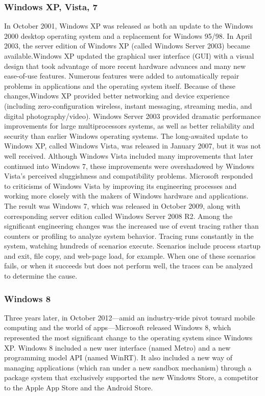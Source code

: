 \documentclass[12pt]{article}
\begin{document}
\subsubsection*{Windows XP, Vista, 7}
In October 2001, Windows XP was released as both an update to the Windows
2000 desktop operating system and a replacement for Windows 95/98. In April
2003, the server edition of Windows XP (called Windows Server 2003) became
available.Windows XP updated the graphical user interface (GUI) with a visual
design that took advantage of more recent hardware advances and many
new ease-of-use features. Numerous features were added to automatically
repair problems in applications and the operating system itself. Because of
these changes,Windows XP provided better networking and device experience
(including zero-configuration wireless, instant messaging, streaming media,
and digital photography/video). Windows Server 2003 provided dramatic
performance improvements for large multiprocessors systems, as well as better
reliability and security than earlier Windows operating systems.
The long-awaited update to Windows XP, called Windows Vista, was
released in January 2007, but it was not well received. Although Windows
Vista included many improvements that later continued into Windows 7, these
improvements were overshadowed by Windows Vista’s perceived sluggishness
and compatibility problems. Microsoft responded to criticisms of Windows
Vista by improving its engineering processes and working more closely
with the makers of Windows hardware and applications.
The result was Windows 7, which was released in October 2009, along
with corresponding server edition called Windows Server 2008 R2. Among
the significant engineering changes was the increased use of event tracing
rather than counters or profiling to analyze system behavior. Tracing runs
constantly in the system, watching hundreds of scenarios execute. Scenarios
include process startup and exit, file copy, and web-page load, for example.
When one of these scenarios fails, or when it succeeds but does not perform
well, the traces can be analyzed to determine the cause.
\subsubsection*{Windows 8}
Three years later, in October 2012—amid an industry-wide pivot toward
mobile computing and the world of apps—Microsoft released Windows 8,
which represented the most significant change to the operating system since
Windows XP. Windows 8 included a new user interface (named Metro) and a
new programming model API (named WinRT). It also included a new way of
managing applications (which ran under a new sandbox mechanism) through
a package system that exclusively supported the new Windows Store, a competitor
to the Apple App Store and the Android Store.
\end{document}

